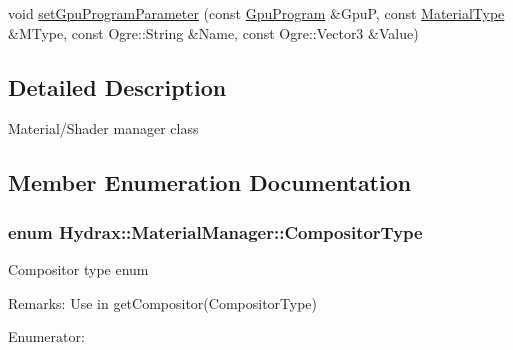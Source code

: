 \begin{CompactItemize}
\begin{CompactItemize}
\item 
void \hyperlink{class_hydrax_1_1_material_manager_8f696ec503c68b349a417b4c82cf9dfc}{setGpuProgramParameter} (const \hyperlink{class_hydrax_1_1_material_manager_a0cfb2fce7a409771c0751d04afa2514}{GpuProgram} \&GpuP, const \hyperlink{class_hydrax_1_1_material_manager_cffd193405105e0f9f528cee40fdad15}{MaterialType} \&MType, const Ogre::String \&Name, const Ogre::Vector3 \&Value)
\end{CompactItemize}


\subsection{Detailed Description}
Material/Shader manager class 

\subsection{Member Enumeration Documentation}
\hypertarget{class_hydrax_1_1_material_manager_9ec2b5e6a97ef7589119e888a7a32174}{
\subsubsection[{CompositorType}]{\setlength{\rightskip}{0pt plus 5cm}enum {\bf Hydrax::MaterialManager::CompositorType}}}
\label{class_hydrax_1_1_material_manager_9ec2b5e6a97ef7589119e888a7a32174}


Compositor type enum \begin{Desc}
\item[Remarks:]Use in getCompositor(CompositorType) \end{Desc}
\begin{Desc}
\item[Enumerator: ]\par
\begin{description}
\item[{\em 
\hypertarget{class_hydrax_1_1_material_manager_9ec2b5e6a97ef7589119e888a7a32174e293175314a47d86f40b5d420ae93a50}{
COMP\_\-UNDERWATER}
\label{class_hydrax_1_1_material_manager_9ec2b5e6a97ef7589119e888a7a32174e293175314a47d86f40b5d420ae93a50}
}]\end{description}
\end{Desc}


\end{CompactItemize}
